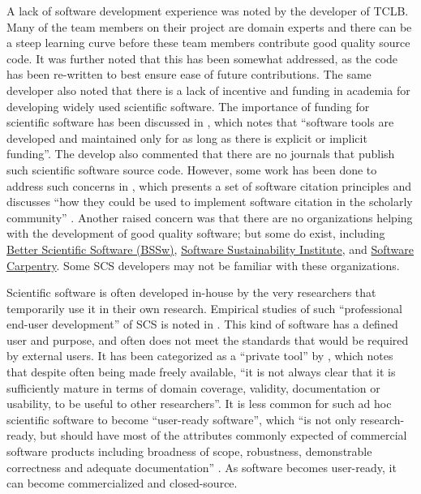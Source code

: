 \documentclass[12pt, notitlepage]{article}
\begin{document}
A lack of software development experience was noted by the developer of TCLB. Many of the team members on their project are domain experts and there can be a steep learning curve before these team members contribute good quality source code. It was further noted that this has been somewhat addressed, as the code has been re-written to best ensure ease of future contributions. The same developer also noted that there is a lack of incentive and funding in academia for developing widely used scientific software. The importance of funding for scientific software has been discussed in \cite{gewaltig2012quality}, which notes that ``software tools are developed and maintained only for as long as there is explicit or implicit funding''. The develop also commented that there are no journals that publish such scientific software source code. However, some work has been done to address such concerns in \citep{smith2016software}, which presents a set of software citation principles and discusses ``how they could be used to implement software citation in the scholarly community'' \citep{katz2019software}. Another raised concern was that there are no organizations helping with the development of good quality software; but some do exist, including \href{https://bssw.io/}{Better Scientific Software (BSSw)}, \href{https://www.software.ac.uk/}{Software Sustainability Institute}, and \href{https://software-carpentry.org/}{Software Carpentry}. Some SCS developers may not be familiar with these organizations. 

Scientific software is often developed in-house by the very researchers that temporarily use it in their own research. Empirical studies of such ``professional end-user development'' of SCS is noted in \citep{segal2007end}. This kind of software has a defined user and purpose, and often does not meet the standards that would be required by external users. It has been categorized as a ``private tool'' by \citep{gewaltig2012quality}, which notes that despite often being made freely available, ``it is not always clear that it is sufficiently mature in terms of domain coverage, validity, documentation or usability, to be useful to other researchers''. It is less common for such ad hoc scientific software to become ``user-ready software'', which ``is not only research-ready, but should have most of the attributes commonly expected of commercial software products including broadness of scope, robustness, demonstrable correctness and adequate documentation'' \citep{gewaltig2012quality}. As software becomes user-ready, it can become commercialized and closed-source. 
\end{document}
